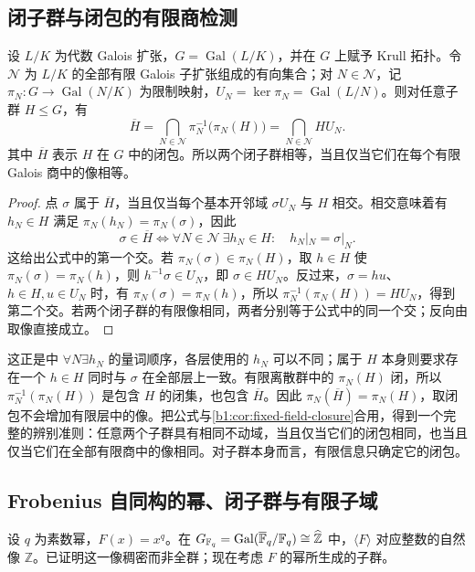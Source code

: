 \subsection{闭子群与闭包的有限商检测}
\label{b1:subsec:2205:01}
\begin{proposition}\label{b1:prop:closure-finite-quotients}
	设 \(L/K\) 为代数 Galois 扩张，\(G=\operatorname{Gal}(L/K)\)，并在 \(G\) 上赋予 Krull 拓扑。令 \(\mathcal N\) 为 \(L/K\) 的全部有限 Galois 子扩张组成的有向集合；对 \(N\in\mathcal N\)，记 \(\pi_N:G\rightarrow\operatorname{Gal}(N/K)\) 为限制映射，\(U_N=\ker\pi_N=\operatorname{Gal}(L/N)\)。则对任意子群 \(H\leq G\)，有
	\begin{equation}\label{b1:eq:closure-finite-quotients}
		\overline H=\bigcap_{N\in\mathcal N}\pi_N^{-1}\bigl(\pi_N(H)\bigr) =\bigcap_{N\in\mathcal N}HU_N.
	\end{equation}
	其中 \(\overline H\) 表示 \(H\) 在 \(G\) 中的闭包。所以两个闭子群相等，当且仅当它们在每个有限 Galois 商中的像相等。
\end{proposition}
\begin{proof}
	点 \(\sigma\) 属于 \(\overline H\)，当且仅当每个基本开邻域 \(\sigma U_N\) 与 \(H\) 相交。相交意味着有 \(h_N\in H\) 满足 \(\pi_N(h_N)=\pi_N(\sigma)\)，因此
	\[
		\sigma\in\overline H \iff \forall N\in\mathcal N\ \exists h_N\in H:\quad h_N|_N=\sigma|_N.
	\]
	这给出公式中的第一个交。若 \(\pi_N(\sigma)\in\pi_N(H)\)，取 \(h\in H\) 使 \(\pi_N(\sigma)=\pi_N(h)\)，则 \(h^{-1}\sigma\in U_N\)，即 \(\sigma\in HU_N\)。反过来，\(\sigma=hu\)、\(h\in H,u\in U_N\) 时，有 \(\pi_N(\sigma)=\pi_N(h)\)，所以 \(\pi_N^{-1}(\pi_N(H))=HU_N\)，得到第二个交。若两个闭子群的有限像相同，两者分别等于公式中的同一个交；反向由取像直接成立。
\end{proof}
这正是中 \(\forall N\exists h_N\) 的量词顺序，各层使用的 \(h_N\) 可以不同；属于 \(H\) 本身则要求存在一个 \(h\in H\) 同时与 \(\sigma\) 在全部层上一致。有限离散群中的 \(\pi_N(H)\) 闭，所以 \(\pi_N^{-1}(\pi_N(H))\) 是包含 \(H\) 的闭集，也包含 \(\overline H\)。因此 \(\pi_N(\overline H)=\pi_N(H)\)，取闭包不会增加有限层中的像。把公式与\cref{b1:cor:fixed-field-closure}合用，得到一个完整的辨别准则：任意两个子群具有相同不动域，当且仅当它们的闭包相同，也当且仅当它们在全部有限商中的像相同。对子群本身而言，有限信息只确定它的闭包。

\subsection{Frobenius 自同构的幂、闭子群与有限子域}
\label{b1:subsec:2205:02}
设 \(q\) 为素数幂，\(F(x)=x^q\)。在 \(G_{\mathbb F_q}=\operatorname{Gal}(\overline{\mathbb F}_q/\mathbb F_q)\cong\widehat{\vphantom{Z}\mathbb Z}\) 中，\(\langle F\rangle\) 对应整数的自然像 \(\mathbb Z\)。已证明这一像稠密而非全群；现在考虑 \(F\) 的幂所生成的子群。

